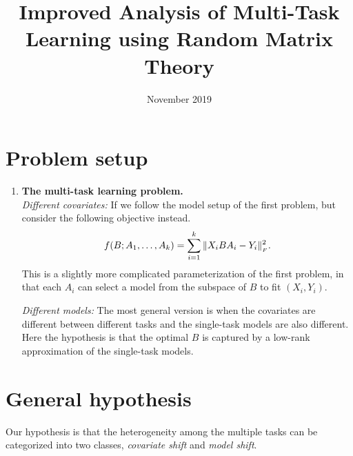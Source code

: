 \documentclass{article}
\title{Improved Analysis of Multi-Task Learning using Random Matrix Theory}
\date{November 2019}
\begin{document}
\maketitle

\section{Problem setup}

\begin{enumerate}
  \item {\bf The multi-task learning problem.} \\
    {\it Different covariates:}
    If we follow the model setup of the first problem, but consider the following objective instead.
    \begin{align}
        f(B; A_1, \dots, A_k) = \sum_{i=1}^k \|X_i B A_i - Y_i\|_{_{F}}^2.
    \end{align}
    This is a slightly more complicated parameterization of the first problem, in that each $A_i$ can select a model from the subspace of $B$ to fit $(X_i, Y_i)$.

    {\it Different models:} The most general version is when the covariates are different between different tasks and the single-task models are also different.
    Here the hypothesis is that the optimal $B$ is captured by a low-rank approximation of the single-task models.
\end{enumerate}

\section{General hypothesis}

Our hypothesis is that the heterogeneity among the multiple tasks can be categorized into two classes, \textit{covariate shift} and \textit{model shift}. 
\end{document}

